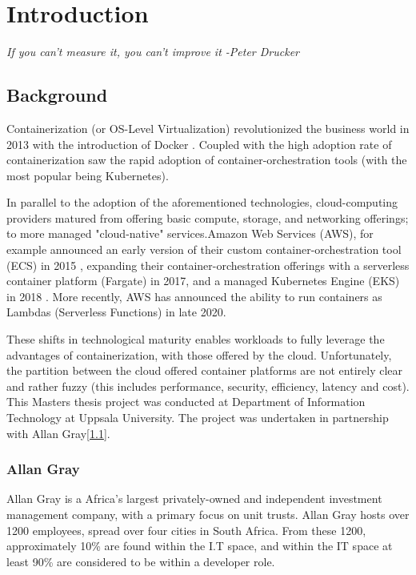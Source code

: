 \part{Introduction}
\textit{If you can't measure it, you can't improve it -Peter Drucker}

\chapter{Background}
Containerization (or OS-Level Virtualization) \cite{virtualization} revolutionized the business world in 2013 with the introduction of Docker \cite{docker}.
Coupled with the high adoption rate of containerization saw the rapid adoption of container-orchestration tools (with the most popular being Kubernetes\cite{k8s}).

In parallel to the adoption of the aforementioned technologies, cloud-computing providers matured from offering basic compute, storage,
and networking offerings; to more managed "cloud-native" services.Amazon Web Services (AWS),
for example announced an early version of their custom container-orchestration tool (ECS) in 2015 \cite{ecs},
expanding their container-orchestration offerings with a serverless container platform (Fargate) in 2017\cite{fargate},
and a managed Kubernetes Engine (EKS) in 2018 \cite{eks}.
More recently, AWS has announced the ability to run containers as Lambdas (Serverless Functions) in late 2020\cite{lambda}.

\noindent These shifts in technological maturity enables workloads to fully leverage the advantages of containerization, with those offered by the cloud.
Unfortunately, the partition between the cloud offered container platforms are not entirely clear and rather fuzzy
(this includes performance, security, efficiency, latency and cost).\\

\noindent This Masters thesis project was conducted at Department of Information Technology at Uppsala University.
The project was undertaken in partnership with Allan Gray[\ref{sec:allan_gray}].

\section{Allan Gray}
\label{sec:allan_gray}
Allan Gray\cite{allan_gray} is a Africa's largest privately-owned and independent investment management company, with a primary focus on unit trusts.
Allan Gray hosts over 1200 employees, spread over four cities in South Africa. From these 1200, approximately 10\% are found within the I.T space,
and within the IT space at least 90\% are considered to be within a developer role.

